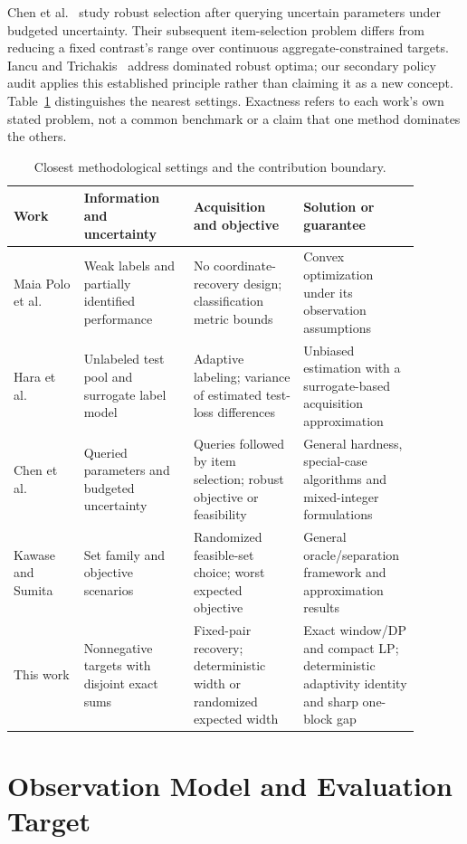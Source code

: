 \documentclass[12pt]{article}
\begin{document}
Chen et al.~\cite{chen2026} study robust selection after querying uncertain
parameters under budgeted uncertainty. Their subsequent item-selection
problem differs from reducing a fixed contrast's range over continuous
aggregate-constrained targets. Iancu and Trichakis~\cite{iancu2014} address
dominated robust optima; our secondary policy audit applies this established
principle rather than claiming it as a new concept.
Table~\ref{tab:closest-work} distinguishes the nearest settings. Exactness
refers to each work's own stated problem, not a common benchmark or a claim
that one method dominates the others.
\begin{table}[htbp]\centering\footnotesize
\caption{Closest methodological settings and the contribution boundary.}
\label{tab:closest-work}
\begin{tabular}{>{\raggedright\arraybackslash}p{0.16\linewidth}>{\raggedright\arraybackslash}p{0.25\linewidth}>{\raggedright\arraybackslash}p{0.25\linewidth}>{\raggedright\arraybackslash}p{0.23\linewidth}}\toprule
Work & Information and uncertainty & Acquisition and objective & Solution or guarantee\\\midrule
Maia Polo et al.~\cite{polo} & Weak labels and partially identified performance & No coordinate-recovery design; classification metric bounds & Convex optimization under its observation assumptions\\
Hara et al.~\cite{hara} & Unlabeled test pool and surrogate label model & Adaptive labeling; variance of estimated test-loss differences & Unbiased estimation with a surrogate-based acquisition approximation\\
Chen et al.~\cite{chen2026} & Queried parameters and budgeted uncertainty & Queries followed by item selection; robust objective or feasibility & General hardness, special-case algorithms and mixed-integer formulations\\
Kawase and Sumita~\cite{kawase2024} & Set family and objective scenarios & Randomized feasible-set choice; worst expected objective & General oracle/separation framework and approximation results\\
This work & Nonnegative targets with disjoint exact sums & Fixed-pair recovery; deterministic width or randomized expected width & Exact window/DP and compact LP; deterministic adaptivity identity and sharp one-block gap\\
\bottomrule\end{tabular}\end{table}

\section{Observation Model and Evaluation Target}
\end{document}
